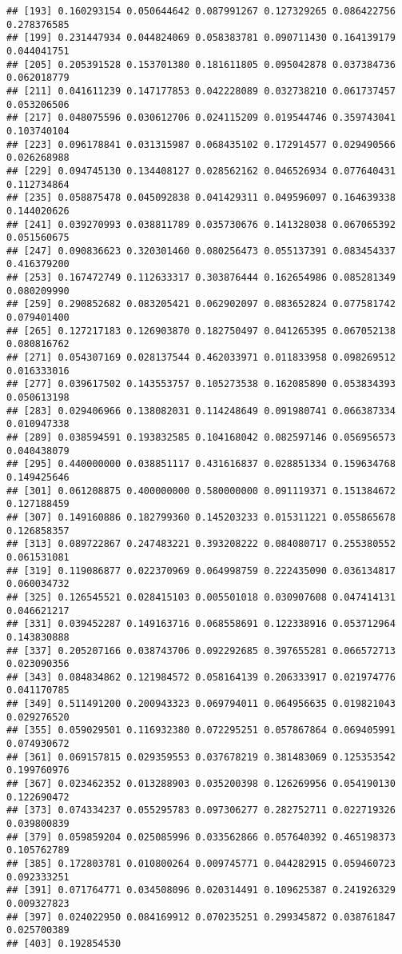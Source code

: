 \documentclass[
]{article}
\begin{document}
\begin{verbatim}
## [193] 0.160293154 0.050644642 0.087991267 0.127329265 0.086422756 0.278376585
## [199] 0.231447934 0.044824069 0.058383781 0.090711430 0.164139179 0.044041751
## [205] 0.205391528 0.153701380 0.181611805 0.095042878 0.037384736 0.062018779
## [211] 0.041611239 0.147177853 0.042228089 0.032738210 0.061737457 0.053206506
## [217] 0.048075596 0.030612706 0.024115209 0.019544746 0.359743041 0.103740104
## [223] 0.096178841 0.031315987 0.068435102 0.172914577 0.029490566 0.026268988
## [229] 0.094745130 0.134408127 0.028562162 0.046526934 0.077640431 0.112734864
## [235] 0.058875478 0.045092838 0.041429311 0.049596097 0.164639338 0.144020626
## [241] 0.039270993 0.038811789 0.035730676 0.141328038 0.067065392 0.051560675
## [247] 0.090836623 0.320301460 0.080256473 0.055137391 0.083454337 0.416379200
## [253] 0.167472749 0.112633317 0.303876444 0.162654986 0.085281349 0.080209990
## [259] 0.290852682 0.083205421 0.062902097 0.083652824 0.077581742 0.079401400
## [265] 0.127217183 0.126903870 0.182750497 0.041265395 0.067052138 0.080816762
## [271] 0.054307169 0.028137544 0.462033971 0.011833958 0.098269512 0.016333016
## [277] 0.039617502 0.143553757 0.105273538 0.162085890 0.053834393 0.050613198
## [283] 0.029406966 0.138082031 0.114248649 0.091980741 0.066387334 0.010947338
## [289] 0.038594591 0.193832585 0.104168042 0.082597146 0.056956573 0.040438079
## [295] 0.440000000 0.038851117 0.431616837 0.028851334 0.159634768 0.149425646
## [301] 0.061208875 0.400000000 0.580000000 0.091119371 0.151384672 0.127188459
## [307] 0.149160886 0.182799360 0.145203233 0.015311221 0.055865678 0.126858357
## [313] 0.089722867 0.247483221 0.393208222 0.084080717 0.255380552 0.061531081
## [319] 0.119086877 0.022370969 0.064998759 0.222435090 0.036134817 0.060034732
## [325] 0.126545521 0.028415103 0.005501018 0.030907608 0.047414131 0.046621217
## [331] 0.039452287 0.149163716 0.068558691 0.122338916 0.053712964 0.143830888
## [337] 0.205207166 0.038743706 0.092292685 0.397655281 0.066572713 0.023090356
## [343] 0.084834862 0.121984572 0.058164139 0.206333917 0.021974776 0.041170785
## [349] 0.511491200 0.200943323 0.069794011 0.064956635 0.019821043 0.029276520
## [355] 0.059029501 0.116932380 0.072295251 0.057867864 0.069405991 0.074930672
## [361] 0.069157815 0.029359553 0.037678219 0.381483069 0.125353542 0.199760976
## [367] 0.023462352 0.013288903 0.035200398 0.126269956 0.054190130 0.122690472
## [373] 0.074334237 0.055295783 0.097306277 0.282752711 0.022719326 0.039800839
## [379] 0.059859204 0.025085996 0.033562866 0.057640392 0.465198373 0.105762789
## [385] 0.172803781 0.010800264 0.009745771 0.044282915 0.059460723 0.092333251
## [391] 0.071764771 0.034508096 0.020314491 0.109625387 0.241926329 0.009327823
## [397] 0.024022950 0.084169912 0.070235251 0.299345872 0.038761847 0.025700389
## [403] 0.192854530
\end{verbatim}
\end{document}
